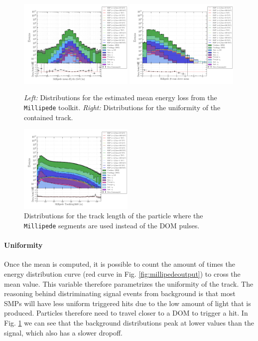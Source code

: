 \begin{figure}
\centering
\includegraphics[width=0.49\textwidth]{chapter8/img/1D_stack_millipede_dedx_mean_nozeroes.png}
\includegraphics[width=0.49\textwidth]{chapter8/img/1D_stack_millipede_dedx_runsabovemean.png}
\caption{\textit{Left: }Distributions for the estimated mean energy loss from the \texttt{Millipede} toolkit. \textit{Right: }Distributions for the uniformity of the contained track.}
\label{fig:allmillipedevar1}
\end{figure}

\begin{figure}
\centering
\includegraphics[width=0.49\textwidth]{chapter8/img/1D_stack_millipede_tracklength60.png}
\caption{Distributions for the track length of the particle where the \texttt{Millipede} segments are used instead of the DOM pulses.}
\label{fig:allmillipedevar2}
\end{figure}

\paragraph{Uniformity}
Once the mean is computed, it is possible to count the amount of times the energy distribution curve (red curve in Fig. \ref{fig:millipedeoutput}) to cross the mean value. This variable therefore parametrizes the uniformity of the track. The reasoning behind distriminating signal events from background is that most SMPs will have less uniform triggered hits due to the low amount of light that is produced. Particles therefore need to travel closer to a DOM to trigger a hit. In Fig. \ref{fig:allmillipedevar1} we can see that the background distributions peak at lower values than the signal, which also has a slower dropoff. 

